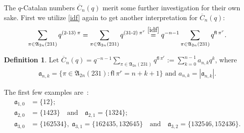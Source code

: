 \documentclass[12pt,reqno]{amsart}
\numberwithin{equation}{section}
\theoremstyle{plain}
\theoremstyle{definition}
\newtheorem{Def}[theorem]{Definition}
\def\A{\mathfrak{A}}
\def\a{\mathfrak{a}}
\def\cab{31\text{-}2}
\def\bac{2\text{-}13}
\def\fl{\mathsf{fl}}
\begin{document}
The $q$-Catalan numbers $\overline{C}_n(q)$ merit some further investigation for their own sake. First we utilize \eqref{idf} again to get another interpretation for $\overline{C}_n(q)$: $$\sum\limits_{\pi\in\A_{2n}(231)}q^{(\bac)\:\pi}=\sum\limits_{\pi\in\A_{2n}(231)}q^{(\cab)\:\pi^r}\stackrel{\eqref{idf}}{=}q^{-n-1}\sum\limits_{\pi\in\A_{2n}(231)}q^{\fl\:\pi^r}.$$

\begin{Def}
Let $\overline{C}_n(q)=q^{-n-1}\sum\limits_{\pi\in\A_{2n}(231)}q^{\fl\:\pi^r}:=\sum\limits_{k=0}^{n-1}a_{n, k}q^k$, where
\begin{align*}
\a_{n, k}=\{\pi\in \A_{2n}(231): \fl\:\pi^r=n+k+1\}\,\, \text{and} \,\, a_{n, k}=|\a_{n, k}|.
\end{align*}
\end{Def}
The first few examples are~:
\begin{align*}
\a_{1,0}&=\{12\};\\
\a_{2,0}&=\{1423\}\quad\text{and}\quad \a_{2,1}=\{1324\};\\
\a_{3,0}&=\{162534\}, \;\a_{3,1}=\{162435, 132645\}\quad\text{and}\quad
\a_{3,2}=\{132546, 152436\}.
\end{align*}
\end{document}
